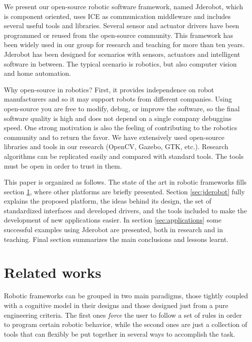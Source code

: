 \documentclass[twocolumn]{svjour3}          %
\begin{document}

We present our open-source robotic software framework, named Jderobot, which is component oriented, uses ICE as communication middleware and includes several useful tools and libraries. Several sensor and actuator drivers have been programmed or reused from the open-source community. This framework has been widely used in our group for research and teaching for more than ten years. Jderobot has been designed for scenarios with sensors, actuators and intelligent software in between. The typical scenario is robotics, but also computer vision and home automation.

Why open-source in robotics? First, it provides independence on robot manufacturers and so it may support robots from different companies. Using open-source you are free to modify, debug, or improve the software, so the final software quality is high and does not depend on a single company debuggins speed. One strong motivation is also the feeling of contributing to the robotics community and to return the favor. We have extensively used open-source libraries and tools in our research (OpenCV, Gazebo, GTK, etc.). Research algorithms can be replicated easily and compared with standard tools. The tools must be open in order to trust in them.

This paper is organized as follows. The state of the art in robotic frameworks fills section \ref{sec:relatedworks}, where other platforms are briefly presented. Section \ref{sec:jderobot} fully explains the proposed platform, the ideas behind its design, the set of standardized interfaces and developed drivers, and the tools included to make the development of new applications easier. In section \ref{sec:applications} some successful examples using Jderobot are presented, both in research and in teaching. Final section summarizes the main conclusions and lessons learnt.

\section{Related works}
\label{sec:relatedworks}

Robotic frameworks can be grouped in two main paradigms, those tightly
coupled with a cognitive model in their designs and those designed
just from a pure engineering criteria. The first ones \textit{force}
the user to follow a set of rules in order to program certain robotic
behavior, while the second ones are just a collection of tools that
can flexibly be put together in several ways to accomplish the task.
\end{document}
